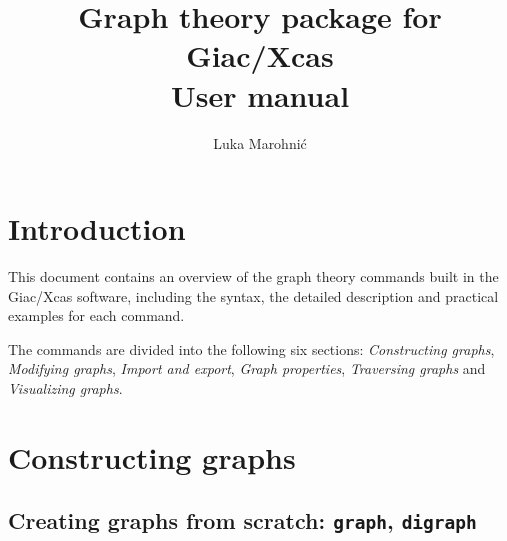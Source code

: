 \documentclass[a4paper,11pt]{article}
\title{\textbf{Graph theory package for Giac/Xcas}\\User manual}
\author{Luka Marohnić}
\begin{document}
\maketitle
\tableofcontents

\section{Introduction}

This document contains an overview of the graph theory commands built in the Giac/Xcas software, including the syntax, the detailed description and practical examples for each command.

The commands are divided into the following six sections: \emph{Constructing graphs}, \emph{Modifying graphs}, \emph{Import and export}, \emph{Graph properties}, \emph{Traversing graphs} and \emph{Visualizing graphs}.

\section{Constructing graphs}

\subsection{Creating graphs from scratch: {\tt graph}, {\tt digraph}}
\end{document}
